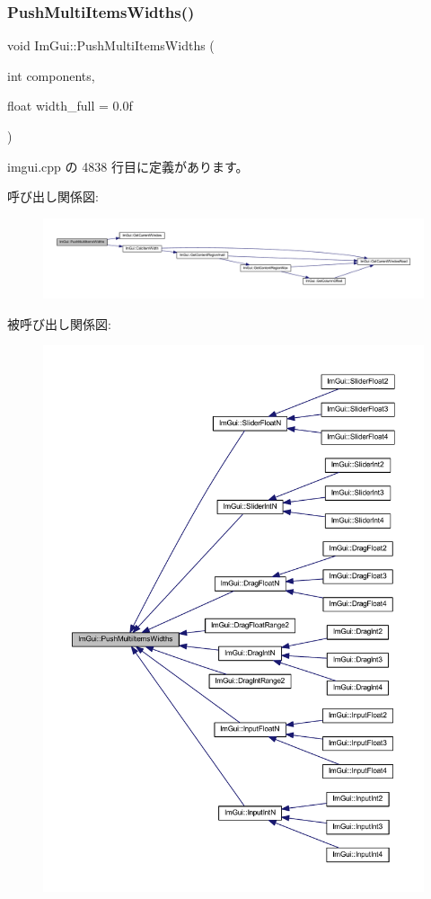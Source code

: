 \subsubsection{\texorpdfstring{Push\+Multi\+Items\+Widths()}{PushMultiItemsWidths()}}
{\footnotesize\ttfamily void Im\+Gui\+::\+Push\+Multi\+Items\+Widths (\begin{DoxyParamCaption}\item[{int}]{components,  }\item[{float}]{width\+\_\+full = {\ttfamily 0.0f} }\end{DoxyParamCaption})}



 imgui.\+cpp の 4838 行目に定義があります。

呼び出し関係図\+:\nopagebreak
\begin{figure}[H]
\begin{center}
\leavevmode
\includegraphics[width=350pt]{namespace_im_gui_ab913605fcf6d405d102cdf56cd414a5a_cgraph}
\end{center}
\end{figure}
被呼び出し関係図\+:\nopagebreak
\begin{figure}[H]
\begin{center}
\leavevmode
\includegraphics[width=350pt]{namespace_im_gui_ab913605fcf6d405d102cdf56cd414a5a_icgraph}
\end{center}
\end{figure}

